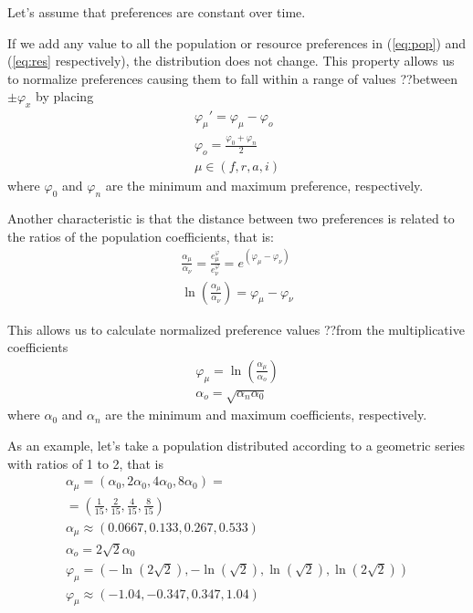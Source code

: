 \documentclass[a4paper,twoside]{article}
\begin{document}
Let's assume that preferences are constant over time.

If we add any value to all the population or resource preferences in (\ref{eq:pop}) and (\ref{eq:res} respectively), the distribution does not change.
This property allows us to normalize preferences
causing them to fall within a range of values ??between $ \pm \varphi_x$ by placing
\begin{eqnarray*}
	\varphi_\mu' = \varphi_\mu - \varphi_o
	\\
	\varphi_o = \frac{\varphi_0 + \varphi_n}{2}
	\\
	\mu \in (f, r, a, i)
\end{eqnarray*}
where $ \varphi_0 $ and $ \varphi_n $ are the minimum and maximum preference, respectively.

Another characteristic is that the distance between two preferences is related to the ratios of the population coefficients, that is:
\begin{eqnarray*}
	\frac{\alpha_\mu}{\alpha_\nu} = \frac{e^\varphi_\mu}{e^\varphi_\nu} = e^{(\varphi_\mu-\varphi_\nu)}
	\\
	\ln \left( \frac{\alpha_\mu}{\alpha_\nu} \right) = \varphi_\mu-\varphi_\nu
\end{eqnarray*}

This allows us to calculate normalized preference values ??from the multiplicative coefficients
\begin{eqnarray*}
	\varphi_\mu = \ln \left( \frac{\alpha_\mu}{\alpha_o} \right)
	\\
	\alpha_o = \sqrt{\alpha_n \alpha_0}
\end{eqnarray*}
where $ \alpha_0 $ and $ \alpha_n $ are the minimum and maximum coefficients, respectively.

As an example, let's take a population distributed according to a geometric series with ratios of 1 to 2, that is
\begin{align*}
	\alpha_\mu = (\alpha_0, 2 \alpha_0, 4 \alpha_0, 8 \alpha_0) =
	\\
	= \left( \frac{1}{15}, \frac{2}{15}, \frac{4}{15}, \frac{8}{15} \right)
	\\
	\alpha_\mu \approx (0.0667, 0.133, 0.267, 0.533)
	\\
	\alpha_o = 2\sqrt{2}\alpha_0	
	\\
	\varphi_\mu = (-\ln(2\sqrt{2}),-\ln(\sqrt{2}), \ln(\sqrt{2}), \ln(2\sqrt{2}))
	\\
	\varphi_\mu	\approx (-1.04, -0.347, 0.347, 1.04)
\end{align*}
\end{document}
